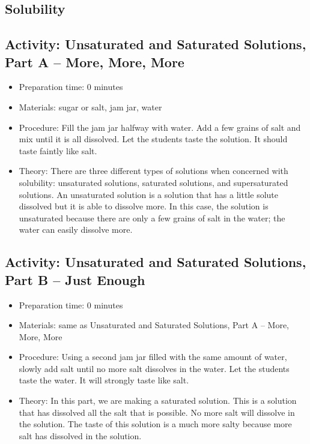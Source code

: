 \begin{itemize}
{\begin{itemize}
\begin{itemize}
{\section{Solubility}

\subsection{Activity: Unsaturated and Saturated Solutions, Part A – More, More, More}
\begin{itemize}
\item{Preparation time: 0 minutes}
\item{Materials: sugar or salt, jam jar, water}
\item{Procedure: Fill the jam jar halfway with water. Add a few grains of salt and mix until it is all dissolved. Let the students taste the solution. It should taste faintly like salt.}
\item{Theory: There are three different types of solutions when concerned with solubility: unsaturated solutions, saturated solutions, and supersaturated solutions. An unsaturated solution is a solution that has a little solute dissolved but it is able to dissolve more. In this case, the solution is unsaturated because there are only a few grains of salt in the water; the water can easily dissolve more.}
\end{itemize}

\subsection{Activity: Unsaturated and Saturated Solutions, Part B – Just Enough}
\begin{itemize}
\item{Preparation time: 0 minutes}
\item{Materials: same as Unsaturated and Saturated Solutions, Part A – More, More, More}
\item{Procedure: Using a second jam jar filled with the same amount of water, slowly add salt until no more salt dissolves in the water. Let the students taste the water. It will strongly taste like salt.}
\item{Theory: In this part, we are making a saturated solution. This is a solution that has dissolved all the salt that is possible. No more salt will dissolve in the solution. The taste of this solution is a much more salty because more salt has dissolved in the solution.}
\end{itemize}

}
\end{itemize}
\end{itemize}}
\end{itemize}
